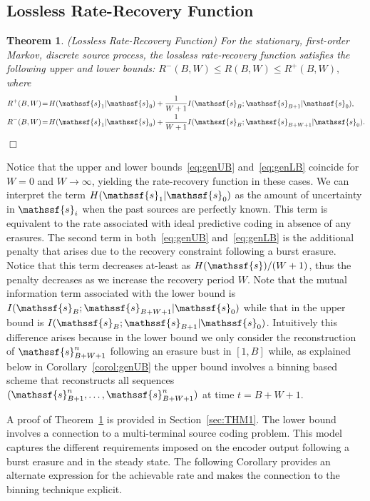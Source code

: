 \documentclass[journal, twocolumn, 10pt]{IEEEtran}
\newtheorem{thm}{Theorem}
\newcommand{\rvs}{{\mathssf{s}}}    %
\begin{document}
\subsection{Lossless Rate-Recovery Function}
\label{sec:LLRR}
\begin{thm}(Lossless Rate-Recovery Function)
For the stationary, first-order Markov, discrete source process, the lossless rate-recovery function satisfies the following upper and lower bounds: $R^-(B,W) \le R(B,W)\le R^+(B,W),$ where
\begin{align}
R^{+}(B, W) &\!=\! H(\rvs_{1}|\rvs_0)+\frac{1}{W+1}I(\rvs_{B};\rvs_{B+1}|\rvs_{0}), \label{eq:genUB}\\
R^-(B, W) &\!=\! H(\rvs_{1}|\rvs_0)+\frac{1}{W+1}I(\rvs_{B};\rvs_{B+W+1}|\rvs_{0}). \label{eq:genLB}
\end{align}
\label{thm:genUB_LB}\hfill$\Box$
\end{thm}
Notice that the upper and lower bounds~\eqref{eq:genUB} and~\eqref{eq:genLB} coincide for $W=0$ and $W \rightarrow\infty$, yielding the rate-recovery function in these cases. We can interpret the term $H(\rvs_1|\rvs_0)$ as the amount of uncertainty in $\rvs_i$ when the past sources are perfectly known.  This term is equivalent to the rate associated with ideal predictive coding in absence of any erasures. The second term in both~\eqref{eq:genUB} and~\eqref{eq:genLB} is the additional penalty that arises due to the recovery constraint following a burst erasure. Notice that this term decreases at-least as $H(\rvs)/(W+1)$, thus the penalty decreases as we increase the recovery period $W$. Note that the mutual information term associated with the lower bound is $I(\rvs_B; \rvs_{B+W+1}|\rvs_0)$ while that in the upper bound is $I(\rvs_B; \rvs_{B+1}|\rvs_0)$. Intuitively this difference arises because in the lower bound we only consider the reconstruction of $\rvs_{B+W+1}^n$ following an erasure bust in $[1,B]$ while, as explained below in Corollary~\ref{corol:genUB} the upper bound involves a binning based scheme that reconstructs  all sequences $(\rvs_{B+1}^n,\ldots, \rvs_{B+W+1}^n)$ at time $t=B+W+1$.  

A proof of Theorem~\ref{thm:genUB_LB} is provided in Section~\ref{sec:THM1}. The lower bound involves a connection to a multi-terminal source coding problem. This model captures the different requirements imposed on the encoder output following a burst erasure and in the steady state. The following Corollary  provides an alternate expression for the achievable rate and makes the connection to the binning technique  explicit. 
\end{document}
